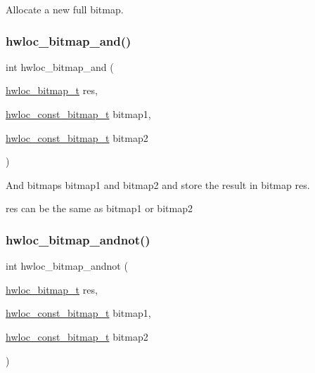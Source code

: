 Allocate a new full bitmap. 

\mbox{\label{a00205_ga674533016ffed922a28b4f0b49b82cd4}} 
\subsubsection{\texorpdfstring{hwloc\+\_\+bitmap\+\_\+and()}{hwloc\_bitmap\_and()}}
{\footnotesize\ttfamily int hwloc\+\_\+bitmap\+\_\+and (\begin{DoxyParamCaption}\item[{\hyperlink{a00205_gaa3c2bf4c776d603dcebbb61b0c923d84}{hwloc\+\_\+bitmap\+\_\+t}}]{res,  }\item[{\hyperlink{a00205_gae991a108af01d408be2776c5b2c467b2}{hwloc\+\_\+const\+\_\+bitmap\+\_\+t}}]{bitmap1,  }\item[{\hyperlink{a00205_gae991a108af01d408be2776c5b2c467b2}{hwloc\+\_\+const\+\_\+bitmap\+\_\+t}}]{bitmap2 }\end{DoxyParamCaption})}



And bitmaps {\ttfamily bitmap1} and {\ttfamily bitmap2} and store the result in bitmap {\ttfamily res}. 

{\ttfamily res} can be the same as {\ttfamily bitmap1} or {\ttfamily bitmap2} \mbox{\label{a00205_ga7ca5c72db65406b85aca032c8a990f9e}} 
\subsubsection{\texorpdfstring{hwloc\+\_\+bitmap\+\_\+andnot()}{hwloc\_bitmap\_andnot()}}
{\footnotesize\ttfamily int hwloc\+\_\+bitmap\+\_\+andnot (\begin{DoxyParamCaption}\item[{\hyperlink{a00205_gaa3c2bf4c776d603dcebbb61b0c923d84}{hwloc\+\_\+bitmap\+\_\+t}}]{res,  }\item[{\hyperlink{a00205_gae991a108af01d408be2776c5b2c467b2}{hwloc\+\_\+const\+\_\+bitmap\+\_\+t}}]{bitmap1,  }\item[{\hyperlink{a00205_gae991a108af01d408be2776c5b2c467b2}{hwloc\+\_\+const\+\_\+bitmap\+\_\+t}}]{bitmap2 }\end{DoxyParamCaption})}



